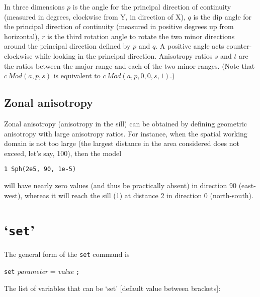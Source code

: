 \documentclass[a4paper,12pt]{book}
\makeatletter
\newcommand{\code}[1]{\texttt{#1}}
\newcommand{\thekey}[1]{\code{{#1}}\label{key:#1}\index{#1@\code{#1}}}
\makeatother
\begin{document}
In three dimensions $p$ is the angle for the principal direction of
continuity (measured in degrees, clockwise from Y, in direction of X),
$q$ is the dip angle for the principal direction of continuity (measured
in positive degrees up from horizontal), $r$ is the third rotation angle
to rotate the two minor directions around the principal direction defined
by $p$ and $q$. A positive angle acts counter-clockwise while looking
in the principal direction. Anisotropy ratios $s$ and $t$ are the ratios
between the major range and each of the two minor ranges. (Note that $c \,
Mod(a,p,s)$ is equivalent to $c \, Mod(a,p,0,0,s,1)$.)

\addtocounter{footnote}{-1}
 \addtocounter{footnote}{1}

\subsection*{Zonal anisotropy}

Zonal anisotropy (anisotropy in the sill) can be obtained by defining
geometric anisotropy with large anisotropy ratios. For instance, when
the spatial working domain is not too large (the largest distance in the
area considered does not exceed, let's say, 100), then the model

{\tt 1 Sph(2e5, 90, 1e-5)}

\noindent
will have nearly zero values (and thus be practically absent) in direction
90 (east-west), whereas it will reach the sill (1) at distance 2 in
direction 0 (north-south).

\section{`\thekey{set}'}
\label{sec:set}

The general form of the {\tt set} command is

{\tt set} {\em parameter} = {\em value} {\tt ;}

\noindent
The list of variables that can be `set' [default value between brackets]:
\end{document}
